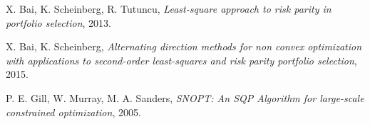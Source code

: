   X. Bai, K. Scheinberg, R. Tutuncu,
  \emph{Least-square approach to risk parity in portfolio selection},
  2013.   
  
  	X. Bai, K. Scheinberg,
  	\emph{Alternating direction methods for non convex
  	optimization with applications to second-order
 	least-squares and risk parity portfolio selection},
  	2015.

	P. E. Gill, W. Murray, M. A. Sanders,
	\emph{SNOPT: An SQP Algorithm for large-scale constrained optimization}, 
	2005.
